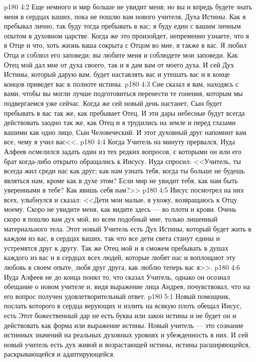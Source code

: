 \vs p180 4:2 Еще немного и мир больше не увидит меня; но вы и впредь будете знать меня в сердцах ваших, пока не пошлю вам нового учителя, Духа Истины. Как я пребывал лично, так буду тогда пребывать в вас; я буду един с вашим личным опытом в духовном царстве. Когда же это произойдет, непременно узнаете, что я в Отце и что, хоть жизнь ваша сокрыта с Отцом во мне, я также в вас. Я любил Отца и соблюл его заповеди; вы любите меня и соблюдете мои заповеди. Как Отец мой дал мне от духа своего, так и я дам вам от моего духа. И сей Дух Истины, который дарую вам, будет наставлять вас и утешать вас и в конце концов приведет вас к полноте истины.
\vs p180 4:3 Сие сказал я вам, находясь с вами, чтобы вы могли лучше подготовиться перенести те гонения, которым мы подвергаемся уже сейчас. Когда же сей новый день настанет, Сын будет пребывать в вас так же, как пребывает Отец. И эти дары небесные будут всегда действовать заодно так же, как Отец и я трудились на земле и перед глазами вашими как одно лицо, Сын Человеческий. И этот духовный друг напомнит вам все, чему я учил вас<<.
\vs p180 4:4 Когда Учитель на минуту прервался, Иуда Алфеев осмелился задать один из тех редких вопросов, с которыми он или его брат когда\hyp{}либо открыто обращались к Иисусу. Иуда спросил: <<Учитель, ты всегда жил среди нас как друг; как нам узнать тебя, когда ты больше не будешь являться нам, кроме как в духе этом? Если мир не увидит тебя, как нам быть уверенными в тебе? Как явишь себя нам?>>
\vs p180 4:5 Иисус посмотрел на них всех, улыбнулся и сказал: <<Дети мои малые, я ухожу, возвращаюсь к Отцу моему. Скоро не увидите меня, как видите здесь --- во плоти и крови. Очень скоро я пошлю вам дух мой, во всем подобный мне, только лишенный материального тела. Этот новый Учитель есть Дух Истины, который будет жить в каждом из вас, в сердцах ваших, так что все дети света станут едины и устремятся друг к другу. Так же Отец мой и я сможем пребывать в душах каждого из вас и в сердцах всех людей, которые любят нас и воплощают эту любовь в своем опыте, любя друг друга, как люблю теперь вас я>>.
\vs p180 4:6 Иуда Алфеев не до конца понял то, что сказал Учитель, однако он осознал обещание о новом учителе и, видя выражение лица Андрея, почувствовал, что на его вопрос получен удовлетворительный ответ.
\vs p180 5:1 Новый помощник, послать которого в сердца верующих и излить на всякую плоть обещал Иисус, есть  Этот божественный дар не есть буква или закон истины и не будет он и действовать как форма или выражение истины. Новый учитель --- это  сознание истинных значений на реальных духовных уровнях и убежденность в них. И сей новый учитель есть дух живой и возрастающей истины, истины расширяющейся, раскрывающейся и адаптирующейся.
